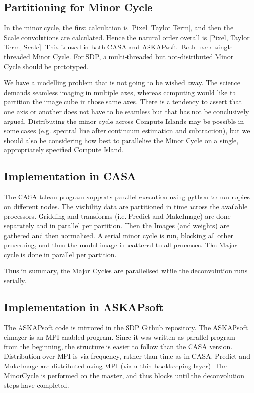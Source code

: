 \documentclass[11pt,a4paper]{article}
\begin{document}
\subsection{Partitioning for Minor Cycle}

In the minor cycle, the first calculation is [Pixel, Taylor Term], and then the Scale convolutions are calculated. Hence the natural order overall is [Pixel, Taylor Term, Scale]. This is used in both CASA and ASKAPsoft. Both use a single threaded Minor Cycle. For SDP, a multi-threaded but not-distributed Minor Cycle should be prototyped.

We have a modelling problem that is not going to be wished away. The science demands seamless imaging in multiple axes, whereas computing would like to partition the image cube in those same axes. There is a tendency to assert that one axis or another does not have to be seamless but that has not be conclusively argued. Distributing the minor cycle across Compute Islands may be possible in some cases (e.g. spectral line after continuum estimation and subtraction), but we should also be considering how best to parallelise the Minor Cycle on a single, appropriately specified Compute Island.

\subsection{Implementation in CASA}

The CASA tclean program supports parallel execution using python to run copies on different nodes. The visibility data are partitioned in time across the available processors. Gridding and transforms (i.e. Predict and MakeImage) are done separately and in parallel per partition. Then the Images (and weights) are gathered and then normalised. A serial minor cycle is run, blocking all other processing, and then the model image is scattered to all processes. The Major cycle is done in parallel per partition.

Thus in summary, the Major Cycles are parallelised while the deconvolution runs serially.

\subsection{Implementation in ASKAPsoft}

The ASKAPsoft code is mirrored in the SDP Github repository. The ASKAPsoft cimager is an MPI-enabled program. Since it was written as parallel program from the beginning, the structure is easier to follow than the CASA version. Distribution over MPI is via frequency, rather than time as in CASA. Predict and MakeImage are distributed using MPI (via a thin bookkeeping layer). The MinorCycle is performed on the master, and thus blocks until the deconvolution steps have completed.
\end{document}
